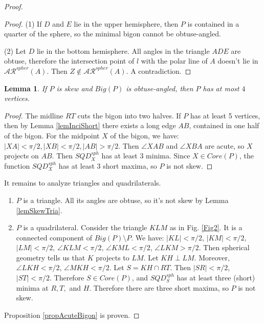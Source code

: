\documentclass[12pt]{amsart}
\newtheorem{lemma}{Lemma}
\newtheorem*{main lemma}{The main lemma}
\begin{document}
\begin{proof}
\begin{proof}
      

        (1) If $D$ and $E$ lie in the upper hemisphere, then $P$ is contained in a quarter of the sphere, so the minimal bigon cannot be obtuse-angled.

        (2) Let $D$ lie in the bottom hemisphere. All angles in the triangle $ADE$  are obtuse, therefore the intersection point of $l$ with the polar line of $A$ doesn't lie in $\mathcal{AR}^{spher}(A)$. Then $Z\notin \mathcal{AR}^{spher}(A)$. A contradiction.
    \end{proof}



    \begin{lemma} \label{lemAtLeast4}
    If $P$ is skew and $Big(P)$ is obtuse-angled, then $P$ has at most $4$ vertices.
    \end{lemma}

    \begin{proof} The midline $RT$ cuts the bigon into two halves. If $P$ has at least 5 vertices, then by Lemma \ref{lemInciShort} there exists a long edge $AB$, contained in one half of the bigon.
For the midpoint $X$ of the bigon, we have: $|XA|<\pi/2, |XB|<\pi/2, |AB|>\pi/2$. Then $\angle XAB$ and $\angle XBA$ are acute, so $X$ projects on $AB$. Then $SQD^{sph}_X$ has at least 3 minima. Since $X\in Core(P)$,  the function $SQD^{sph}_X$ has at least 3 short maxima, so $P$ is not skew.



    \end{proof}

    It remains to analyze triangles and quadrilaterals.
    \begin{enumerate}
        \item $P$ is a triangle. All its angles are obtuse, so it's not skew by Lemma \ref{lemSkewTria}.
        \item $P$ is a quadrilateral. Consider the triangle $KLM$ as in Fig. \ref{Fig2}. It is a connected component of $Big(P)\setminus P$. We have: $|KL| < \pi/2$, $|KM| < \pi/2$, $|LM|< \pi/2$, $\angle KLM <\pi/2$, $\angle KML <\pi/2$, $\angle LKM >\pi/2$. Then spherical geometry tells us that $K$ projects to $LM$. Let $KH \perp LM$. Moreover, $\angle LKH<\pi/2$, $\angle MKH<\pi/2$. Let $S = KH \cap RT$. Then $|SR|<\pi/2$, $|ST|<\pi/2$. Therefore $S\in Core(P)$, and $SQD^{sph}_S$ has at least three (short) minima at $R,T,$ and $H$. Therefore there are three short maxima, so $P$ is not skew.

    \end{enumerate}  Proposition \ref{propAcuteBigon} is proven.
\end{proof}
\end{document}
